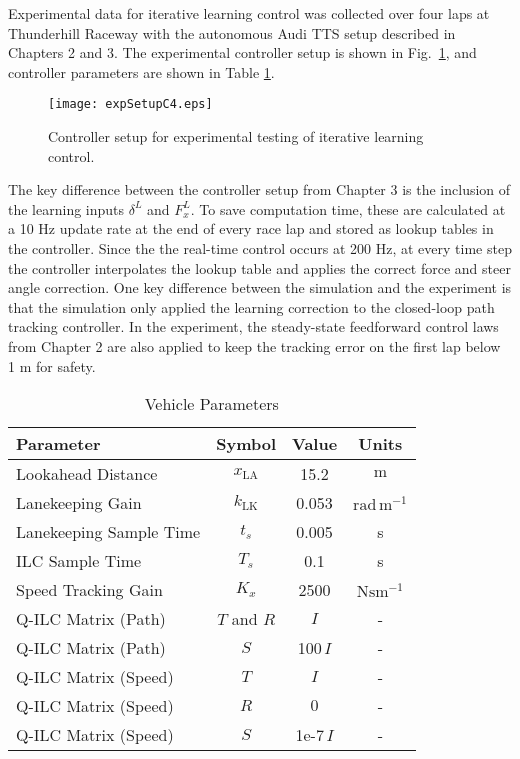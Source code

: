 Experimental data for iterative learning control was collected over four laps at Thunderhill Raceway with the autonomous Audi TTS
setup described in Chapters 2 and 3. The experimental controller setup is shown in Fig.~\ref{fig:C4setup}, and controller parameters are shown in Table \ref{tb:ilcprm}. 

\begin{figure}[h]
\centering
\texttt{[image: expSetupC4.eps]}
\caption{Controller setup for experimental testing of iterative learning control.}
\label{fig:C4setup}
\end{figure}

\newpage
The key difference between the controller setup from Chapter 3 is the inclusion of the learning inputs $\delta^L$ and $F^L_x$. To save
computation time, these are calculated at a 10 Hz update rate at the end of every race lap and stored as lookup tables in the controller. 
Since the the real-time control occurs at 200 Hz, at every time step the controller interpolates
the lookup table and applies the correct force and steer angle correction. One key difference between the simulation and
the experiment is that the simulation only applied the learning correction to the closed-loop path tracking controller. 
In the experiment, the steady-state feedforward
 control laws from Chapter 2 are also applied to keep the tracking error on the first lap below 1 m for safety. 
 
\begin{table}[tb]
\begin{center}
\caption{Vehicle Parameters}\label{tb:ilcprm}
\begin{tabular}{lccc}
Parameter & Symbol & Value & Units \\\hline
Lookahead Distance       & $x_\mathrm{LA}$          &  15.2 & $\mathrm{m} $ \\
Lanekeeping Gain         & $k_{\mathrm{LK}}$         & 0.053 & $\mathrm{rad\,m^{-1}}$\\
Lanekeeping Sample Time  & $t_s$                        & 0.005 & s\\
ILC Sample Time          & $T_s$                        & 0.1   & s\\
Speed Tracking Gain                & $K_x$           & 2500 & $\mathrm{Nsm^{-1}}$\\
Q-ILC Matrix (Path)            & $T$ and $R$              &  $I$      & - \\
Q-ILC Matrix  (Path)           & $S$                       & 100\,$I$  & - \\
Q-ILC Matrix (Speed)            & $T$              &  $I$      & - \\
Q-ILC Matrix (Speed)            & $R$              &  $0$      & - \\
Q-ILC Matrix  (Speed)           & $S$                       & 1e-7\,$I$  & - \\\hline
\end{tabular}
\end{center}
\end{table}


